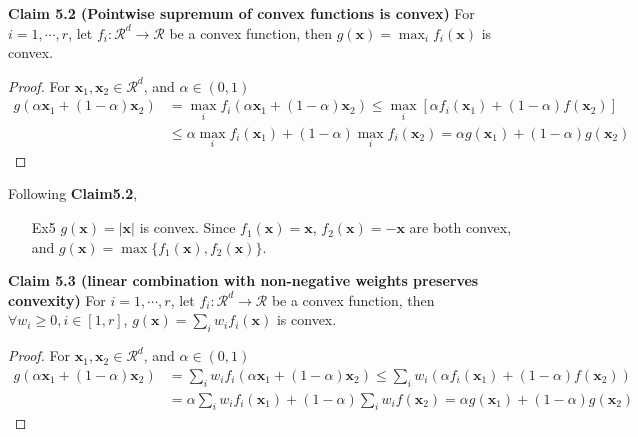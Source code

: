 \documentclass{article}
\newtheorem*{proof}{Proof}
\begin{document}
	\textbf{Claim 5.2 (Pointwise supremum of convex functions is convex)} For $i = 1,\cdots, r$, let $f_i: \mathcal{R}^d \rightarrow \mathcal{R}$ be a convex function, then $g(\mathbf{x})=\max_i f_i(\mathbf{x})$ is convex.
	
	\begin{proof}
	For $\mathbf{x}_1, \mathbf{x}_2 \in \mathcal{R}^d$, and $\alpha \in (0,1)$
	\begin{equation*}
	\begin{split}
	g(\alpha\mathbf{x}_1+(1-\alpha)\mathbf{x}_2) &= \max_i f_i(\alpha \mathbf{x}_1 + (1-\alpha) \mathbf{x}_2)  \leq  \max_i [\alpha f_i( \mathbf{x}_1) + (1-\alpha) f(\mathbf{x}_2)] \\ &\leq   \alpha \max_i f_i(\mathbf{x}_1) + (1-\alpha) \max_i f_i(\mathbf{x}_2) = \alpha g(\mathbf{x}_1) + (1-\alpha) g(\mathbf{x}_2)
	\end{split}
	\end{equation*}
	\end{proof}
	
	Following \textbf{Claim5.2}, 
	\begin{itemize}
	\item[Ex5] $g(\mathbf{x})=|\mathbf{x}|$ is convex. Since $f_1(\mathbf{x})=\mathbf{x}$, $f_2(\mathbf{x})=-\mathbf{x}$ are both convex, and $g(\mathbf{x})=\max\{f_1(\mathbf{x}), f_2(\mathbf{x})\}$.
	\end{itemize}
	
	\textbf{Claim 5.3 (linear combination with non-negative weights preserves convexity)} For $i = 1,\cdots, r$, let $f_i: \mathcal{R}^d \rightarrow \mathcal{R}$ be a convex function, then $\forall w_i\geq 0, i\in[1,r]$, $g(\mathbf{x})=\sum_i w_i f_i(\mathbf{x})$ is convex.
	
	\begin{proof}
	For $\mathbf{x}_1, \mathbf{x}_2 \in \mathcal{R}^d$, and $\alpha \in (0,1)$
	\begin{equation*}
	\begin{split}
	g(\alpha\mathbf{x}_1+(1-\alpha)\mathbf{x}_2) &= \sum_i w_i f_i(\alpha \mathbf{x}_1 + (1-\alpha) \mathbf{x}_2)  \leq  \sum_i w_i(\alpha f_i( \mathbf{x}_1) + (1-\alpha) f(\mathbf{x}_2)) \\ &=   \alpha \sum_i w_i f_i(\mathbf{x}_1) + (1-\alpha) \sum_i w_i f(\mathbf{x}_2) = \alpha g(\mathbf{x}_1) + (1-\alpha) g(\mathbf{x}_2)
	\end{split}
	\end{equation*}
	\end{proof}
\end{document}

